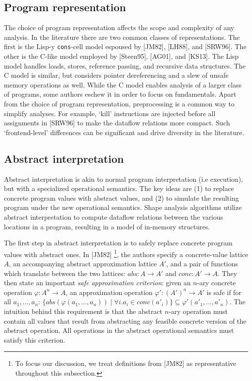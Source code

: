 \documentclass{article}
\begin{document}
\subsection{Program representation}

The choice of program representation affects the scope and complexity of any
analysis. In the literature there are two common classes of representations.
The first is the Lisp-y \texttt{cons}-cell model espoused by [JM82], [LH88],
and [SRW96]. The other is the C-like model employed by [Steen95], [AG01],
and [KS13]. The Lisp model handles loads, stores, reference passing, and
recursive data structures.  The C model is similar, but considers pointer
dereferencing and a slew of unsafe memory operations as well. While the C
model enables analysis of a larger class of programs, some authors eschew it
in order to focus on fundamentals. Apart from the choice of program
representation, preprocessing is a common way to simplify analyses. For
example,  `kill' instructions are injected before all assignments in [SRW96]
to make the dataflow relations more compact. Such `frontend-level'
differences can be significant and drive diversity in the literature.

\subsection{Abstract interpretation}

Abstract interpretation is akin to normal program interpretation (i.e
execution), but with a specialized operational semantics. The key ideas are
(1) to replace concrete program values with abstract values, and (2) to 
simulate the resulting program under the new operational semantics. Shape
analysis algorithms utilize abstract interpretation to compute dataflow
relations between the various locations in a program, resulting in a model
of in-memory structures.

The first step in abstract interpretation is to safely replace concrete
program values with abstract ones. In [JM82] \footnote{To focus our
discussion, we treat definitions from [JM82] as representative throughout 
this subsection.}, the authors specify a concrete-value lattice $A$, an
accompanying abstract approximation lattice $A'$, and a pair of functions
which translate between the two lattices: $abs : A \rightarrow A'$ and $conc
: A' \rightarrow A$. They then state an important \textit{safe approximation
criterion}: given an $n$-ary concrete operation $\varphi : A^n \rightarrow
A$, an approximation operation $\varphi' : (A')^n \rightarrow A'$ is safe if
for all $a_1, ..., a_n$: $\{abs(\varphi(a_1, ..., a_n)) \mid \forall i.  a_i
\in conc(a'_i)\} \subseteq \varphi'(a'_1, ..., a'_n)$. The intuition behind
this requirement is that the abstract $n$-ary operation must contain all
values that result from abstracting any feasible concrete version of the
abstract operation. All operations in the abstract operational semantics
must satisfy this criterion.
\end{document}

